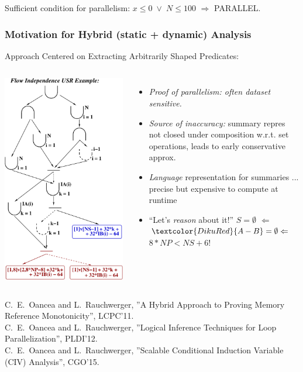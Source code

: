 \documentclass{beamer}
\renewcommand{\emph}[1]{\textcolor{structure}{#1}}
\newcommand{\emp}[1]{\textcolor{DikuRed}{ #1}}
\newcommand{\mymath}[1]{$ #1 $}
\begin{document}
\begin{frame}[fragile,t]

Sufficient condition for parallelism: {\tt $x\leq 0$~$\vee$~$N \leq 100$} \mymath{\Rightarrow} PARALLEL.

\end{frame}


\begin{frame}[fragile,t]
  \frametitle{Motivation for Hybrid (static + dynamic) Analysis}

\begin{block}{Approach Centered on Extracting Arbitrarily Shaped Predicates:} 
\begin{columns}
\includegraphics[height=28ex]{Figures/USR_HE_FIND_SOLVH}
\vspace{-1ex}
\begin{itemize}
    \item \emp{\em Proof of parallelism: often dataset sensitive.}\medskip
    \item \emp{{\em Source of inaccuracy:}} summary repres not closed under composition w.r.t. set operations, leads to early conservative approx.\medskip
    \item \emph{{\em Language}} representation for summaries ... precise but \emp{expensive} to compute at runtime \medskip
    \item ``Let's \emph{{\em reason}} about it!'' $S=\emptyset$ $\Leftarrow$ $\emp{A - B} = \emptyset \Leftarrow$ \emph{$8*NP < NS + 6$}!
\end{itemize}
\end{columns}
\end{block}


{\tiny C.~E.~Oancea and L.~Rauchwerger, ''A Hybrid Approach to Proving Memory Reference Monotonicity'', LCPC'11.}\\
{\tiny C.~E.~Oancea and L.~Rauchwerger, ''Logical Inference Techniques for Loop Parallelization'', PLDI'12.}\\
{\tiny C.~E.~Oancea and L.~Rauchwerger, ''Scalable Conditional Induction Variable (CIV) Analysis'', CGO'15.}

\end{frame}
\end{document}
